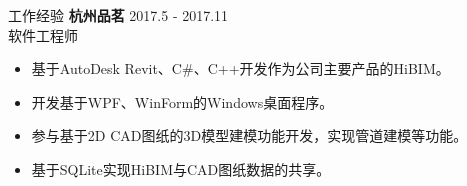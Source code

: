 \documentclass{resume} %
\begin{document}
\begin{rSection}{工作经验}
\textbf{杭州品茗} \hfill 2017.5 - 2017.11\\
软件工程师 \hfill \textit{}
\begin{itemize}
  \itemsep -3pt {}
  \item 基于AutoDesk Revit、C\#、C++开发作为公司主要产品的HiBIM。
  \item 开发基于WPF、WinForm的Windows桌面程序。
  \item 参与基于2D CAD图纸的3D模型建模功能开发，实现管道建模等功能。
  \item 基于SQLite实现HiBIM与CAD图纸数据的共享。
\end{itemize}

\end{rSection}

\end{document}
